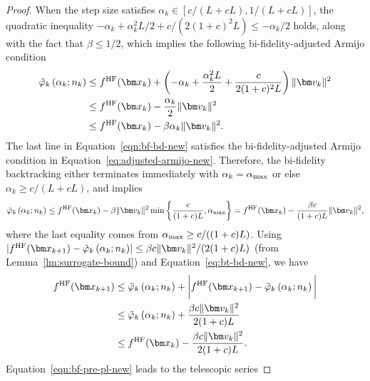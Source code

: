 \documentclass[10pt]{article} %
\numberwithin{equation}{section}
\theoremstyle{plain}
\theoremstyle{definition}
\newcommand{\<}{\langle}
\renewcommand{\>}{\rangle}
\renewcommand{\(}{\left(}
\renewcommand{\)}{\right)}
\renewcommand{\[}{\left[}
\renewcommand{\]}{\right]}
\newcommand{\HF}{\textup{HF}}
\newcommand{\alphaMax}{\alpha_\textup{max}}
\newcommand{\Lip}{L}
\newcommand{\HFSurrogate}{\tilde{\varphi}_k}
\begin{document}
\begin{proof}
    When the step size satisfies $\alpha_k\in[c/(\Lip+c\Lip), 1/(\Lip+c\Lip)]$, the quadratic inequality $-\alpha_k + \alpha_k^2\Lip/2 + c/(2(1+c)^2\Lip)\leq -\alpha_k/2$ holds, along with the fact that $\beta\leq 1/2$, which implies the following bi-fidelity-adjusted Armijo condition
    \begin{equation}
    \label{eqn:bf-bd-new}
    \begin{aligned}
        \HFSurrogate\left(\alpha_k; n_k\right)
        &\leq f^\HF(\bm x_k) + \left( -\alpha_k + \frac{\alpha_k^2\Lip}{2} + \frac{c}{2(1+c)^2\Lip}\right) \lVert \bm v_k\rVert^2\\
        &\leq f^\HF(\bm x_k) -\frac{\alpha_k}{2}\lVert \bm v_k\rVert^2\\
        &\leq f^\HF(\bm x_k) - \beta\alpha_k \lVert \bm v_k\rVert^2.
    \end{aligned}
    \end{equation}
    The last line in Equation~\eqref{eqn:bf-bd-new} satisfies the bi-fidelity-adjusted Armijo condition in Equation~\eqref{eq:adjusted-armijo-new}. Therefore, the bi-fidelity backtracking either terminates immediately with $\alpha_k=\alphaMax$ or else $\alpha_k\geq c/(\Lip+c\Lip)$, and implies 
    \begin{equation}
    \label{eq:bt-bd-new}
        \HFSurrogate\left(\alpha_k; n_k\right) \leq f^\HF(\bm x_k) - \beta\lVert\bm v_k\rVert^2\min\left\{\frac{c}{(1+c)\Lip}, \alphaMax\right\} = f^\HF(\bm x_k) - \frac{\beta c}{(1+c)\Lip}\lVert\bm v_k\rVert^2,
    \end{equation}
    where the last equality comes from $\alphaMax\geq c/((1+c)\Lip)$.
    Using $\lvert f^\HF(\bm x_{k+1}) - \HFSurrogate\left(\alpha_k; n_k\right)\rvert \leq  \beta c\lVert \bm v_k\rVert^2/(2(1+c)\Lip)$ (from Lemma~\ref{lm:surrogate-bound}) and Equation~\eqref{eq:bt-bd-new}, we have
    \begin{equation}
    \label{eqn:bf-pre-pl-new}
    \begin{aligned}
        f^\HF(\bm x_{k+1})  
        &\leq \HFSurrogate\left(\alpha_k; n_k\right) + \bigg\lvert f^\HF(\bm x_{k+1}) - \HFSurrogate\left(\alpha_k; n_k\right)\bigg\rvert\\
        &\leq \HFSurrogate\left(\alpha_k; n_k\right) + \frac{\beta c\lVert \bm v_k\rVert^2}{2(1+c)\Lip}\\
        &\leq f^\HF(\bm x_k) - \frac{\beta c\lVert \bm v_k\rVert^2}{2(1+c)\Lip}.
    \end{aligned}
    \end{equation}
    Equation~\eqref{eqn:bf-pre-pl-new} leads to the telescopic series

\end{proof}
\end{document}

